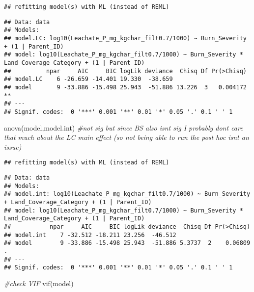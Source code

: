 \documentclass[
]{article}
\newenvironment{Shaded}{\begin{snugshade}}{\end{snugshade}}
\newcommand{\CommentTok}[1]{\textcolor[rgb]{0.56,0.35,0.01}{\textit{#1}}}
\newcommand{\FunctionTok}[1]{\textcolor[rgb]{0.00,0.00,0.00}{#1}}
\newcommand{\NormalTok}[1]{#1}
\begin{document}
\begin{verbatim}
## refitting model(s) with ML (instead of REML)
\end{verbatim}

\begin{verbatim}
## Data: data
## Models:
## model.LC: log10(Leachate_P_mg_kgchar_filt0.7/1000) ~ Burn_Severity + (1 | Parent_ID)
## model: log10(Leachate_P_mg_kgchar_filt0.7/1000) ~ Burn_Severity * Land_Coverage_Category + (1 | Parent_ID)
##          npar     AIC     BIC logLik deviance  Chisq Df Pr(>Chisq)   
## model.LC    6 -26.659 -14.401 19.330  -38.659                        
## model       9 -33.886 -15.498 25.943  -51.886 13.226  3   0.004172 **
## ---
## Signif. codes:  0 '***' 0.001 '**' 0.01 '*' 0.05 '.' 0.1 ' ' 1
\end{verbatim}

\begin{Shaded}
\begin{Highlighting}[]
\FunctionTok{anova}\NormalTok{(model,model.int) }\CommentTok{\#not sig but since BS also isn\textquotesingle{}t sig I probably don\textquotesingle{}t care that much about the LC main effect (so not being able to run the post hoc isn\textquotesingle{}t an issue)}
\end{Highlighting}
\end{Shaded}

\begin{verbatim}
## refitting model(s) with ML (instead of REML)
\end{verbatim}

\begin{verbatim}
## Data: data
## Models:
## model.int: log10(Leachate_P_mg_kgchar_filt0.7/1000) ~ Burn_Severity + Land_Coverage_Category + (1 | Parent_ID)
## model: log10(Leachate_P_mg_kgchar_filt0.7/1000) ~ Burn_Severity * Land_Coverage_Category + (1 | Parent_ID)
##           npar     AIC     BIC logLik deviance  Chisq Df Pr(>Chisq)  
## model.int    7 -32.512 -18.211 23.256  -46.512                       
## model        9 -33.886 -15.498 25.943  -51.886 5.3737  2    0.06809 .
## ---
## Signif. codes:  0 '***' 0.001 '**' 0.01 '*' 0.05 '.' 0.1 ' ' 1
\end{verbatim}

\begin{Shaded}
\begin{Highlighting}[]
\CommentTok{\#check VIF}
\FunctionTok{vif}\NormalTok{(model)}
\end{Highlighting}
\end{Shaded}
\end{document}

